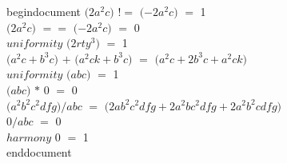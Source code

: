 \usepackage{mathtext}
begin{document}
$($\( 2a^2c \)$)$ $!=$ $($\( -2a^2c \)$)$ $=$ 1\\
$($\( 2a^2c \)$)$ $==$ $($\( -2a^2c \)$)$ $=$ 0\\
$uniformity$ $($\( 2rty^3 \)$)$ $=$ 1\\
$($\( a^2c+b^3c \)$)$ $+$ $($\( a^2ck+b^3c \)$)$ $=$ $($\( a^2c+2b^3c+a^2ck \)$)$\\
$uniformity$ $($\( abc \)$)$ $=$ 1\\
$($\( abc \)$)$ $*$ 0 $=$ 0\\
$($\( a^2b^2c^2dfg \)$)$$/abc$ $=$ $($\( 2ab^2c^2dfg+2a^2bc^2dfg+2a^2b^2cdfg \)$)$\\
0$/abc$ $=$ 0\\
$harmony$ 0 $=$ 1\\
end{document}
